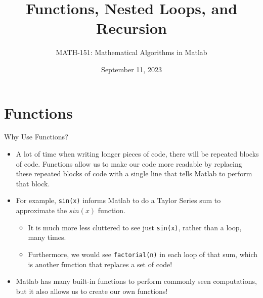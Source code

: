 {}\documentclass[letterpaper,
compress,
xcolor=x11names,
]{beamer}
\begin{document}
	\title{Functions, Nested Loops, and Recursion}
	\author{MATH-151:  Mathematical Algorithms in Matlab}
	\date[202X]{September 11, 2023}




\begin{frame}
\titlepage
\end{frame}
\section{Functions}

\begin{frame}{Why Use Functions?}
	\footnotesize
	\begin{itemize}
		\item A lot of time when writing longer pieces of code, there will be repeated blocks of code. Functions allow us to make our code more readable by replacing these repeated blocks of code with a single line that tells Matlab to perform that block.
		\item For example, \texttt{sin(x)} informs Matlab to do a Taylor Series sum to approximate the $sin(x)$ function.
		\begin{itemize}
			\item It is much more less cluttered to see just \texttt{sin(x)}, rather than a loop, many times.
			\item Furthermore, we would see \texttt{factorial(n)} in each loop of that sum, which is another function that replaces a set of code! 
		\end{itemize}
		\item Matlab has many built-in functions to perform commonly seen computations, but it also allows us to create our own functions! 
	\end{itemize}
\end{frame}

\end{document}
